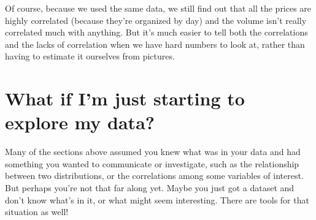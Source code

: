 \documentclass[letterpaper,10pt,english]{jupyterBook}
\begin{document}
\begin{sphinxVerbatim}[commandchars=\\\{\}]
     
     
   
   
    
\end{sphinxVerbatim}

\noindent{}

\sphinxAtStartPar
Of course, because we used the same data, we still find out that all the prices are highly correlated (because they’re organized by day) and the volume isn’t really correlated much with anything.  But it’s much easier to tell both the correlations and the lacks of correlation when we have hard numbers to look at, rather than having to estimate it ourselves from pictures.


\section{What if I’m just starting to explore my data?}
\label{\detokenize{chapter-10-visualization:what-if-i-m-just-starting-to-explore-my-data}}
\sphinxAtStartPar
Many of the sections above assumed you knew what was in your data and had something you wanted to communicate or investigate, such as the relationship between two distributions, or the correlations among some variables of interest.  But perhaps you’re not that far along yet.  Maybe you just got a dataset and don’t know what’s in it, or what might seem interesting.  There are tools for that situation as well!
\end{document}

